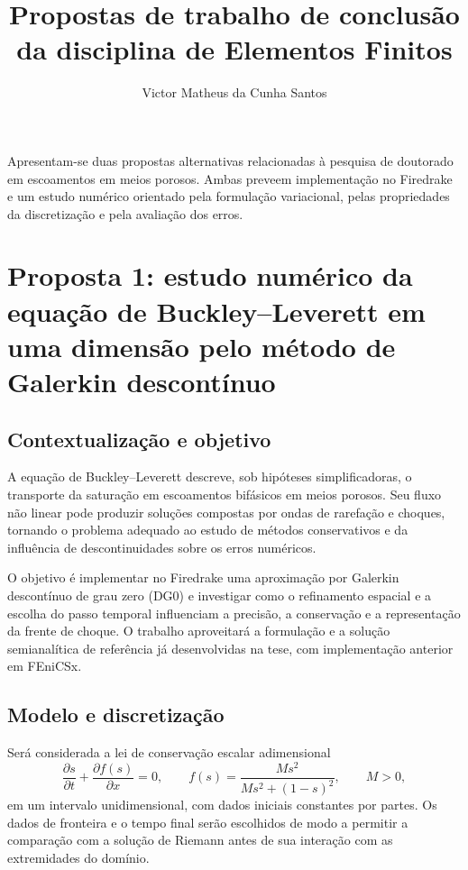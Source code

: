 \documentclass[11pt,a4paper]{article}
\title{Propostas de trabalho de conclusão\\da disciplina de Elementos Finitos}
\author{Victor Matheus da Cunha Santos}
\date{}
\begin{document}
\maketitle

Apresentam-se duas propostas alternativas relacionadas à pesquisa de doutorado em escoamentos em meios porosos. Ambas preveem implementação no Firedrake e um estudo numérico orientado pela formulação variacional, pelas propriedades da discretização e pela avaliação dos erros.

\section{Proposta 1: estudo numérico da equação de Buckley--Leverett em uma dimensão pelo método de Galerkin descontínuo}

\subsection{Contextualização e objetivo}

A equação de Buckley--Leverett descreve, sob hipóteses simplificadoras, o transporte da saturação em escoamentos bifásicos em meios porosos. Seu fluxo não linear pode produzir soluções compostas por ondas de rarefação e choques, tornando o problema adequado ao estudo de métodos conservativos e da influência de descontinuidades sobre os erros numéricos.

O objetivo é implementar no Firedrake uma aproximação por Galerkin descontínuo de grau zero (DG0) e investigar como o refinamento espacial e a escolha do passo temporal influenciam a precisão, a conservação e a representação da frente de choque. O trabalho aproveitará a formulação e a solução semianalítica de referência já desenvolvidas na tese, com implementação anterior em FEniCSx.

\subsection{Modelo e discretização}

Será considerada a lei de conservação escalar adimensional
\begin{equation}
    \frac{\partial s}{\partial t}
    +\frac{\partial f(s)}{\partial x}=0,
    \qquad
    f(s)=\frac{M s^2}{M s^2+(1-s)^2},
    \qquad M>0,
\end{equation}
em um intervalo unidimensional, com dados iniciais constantes por partes. Os dados de fronteira e o tempo final serão escolhidos de modo a permitir a comparação com a solução de Riemann antes de sua interação com as extremidades do domínio.
\end{document}
